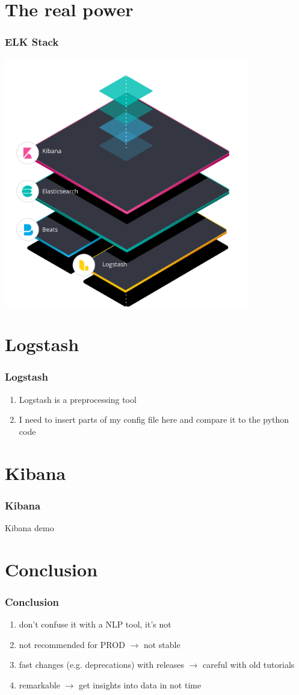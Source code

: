 \documentclass{beamer}
\begin{document}
\section{The real power}
\begin{frame}
  \frametitle{ELK Stack}
    \includegraphics[width=0.8\textwidth]{ELK.png}
\end{frame}

\section{Logstash}
\begin{frame}
  \frametitle{Logstash}
  \begin{enumerate}
   \item Logstash is a preprocessing tool 
   \item I need to insert parts of my config file here and compare it to the python code
  \end{enumerate}
\end{frame}

\section{Kibana}
\begin{frame}
  \frametitle{Kibana}
  Kibana demo
\end{frame}

\section{Conclusion}
\begin{frame}
  \frametitle{Conclusion}
  \begin{enumerate}
   \item don't confuse it with a NLP tool, it's not
   \item not recommended for PROD $\rightarrow$ not stable
   \item fast changes (e.g. deprecations) with releases $\rightarrow$ careful with old tutorials
   \item remarkable $\rightarrow$ get insights into data in not time
  \end{enumerate}
\end{frame}
\end{document}
